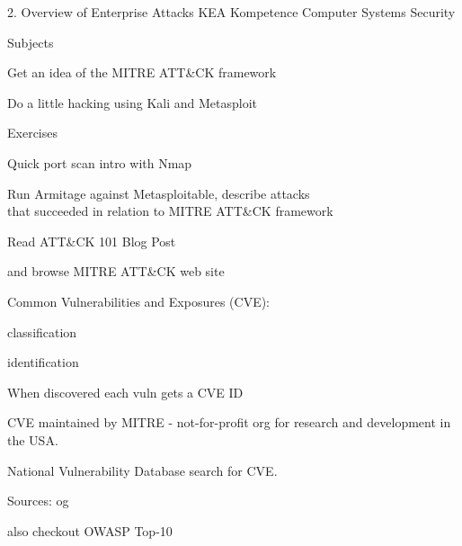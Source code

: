 \documentclass[Screen16to9,17pt]{foils}
\begin{document}
\mytitlepage
{2. Overview of Enterprise Attacks}
{KEA Kompetence Computer Systems Security \the\year}



\begin{list1}
\item Subjects
\begin{list2}
\item Get an idea of the MITRE ATT\&CK framework
\item Do a little hacking using Kali and Metasploit
\end{list2}
\item Exercises
\begin{list2}
\item Quick port scan intro with Nmap
\item Run Armitage against Metasploitable, describe attacks\\
that succeeded in relation to MITRE ATT\&CK framework
\end{list2}
\end{list1}




\begin{list1}
\item Read ATT\&CK 101 Blog Post\\
\item and browse MITRE ATT\&CK web site\\ 
\end{list1}



\begin{list1}
\item Common Vulnerabilities and Exposures (CVE):
  \begin{list2}
  \item classification
  \item identification
  \end{list2}
\item When discovered each vuln gets a CVE ID
\item CVE maintained by MITRE - not-for-profit
org for research and development in the USA.
\item National Vulnerability Database search for CVE.
\item Sources:  og 
\item also checkout OWASP Top-10 
\end{list1}
\end{document}
